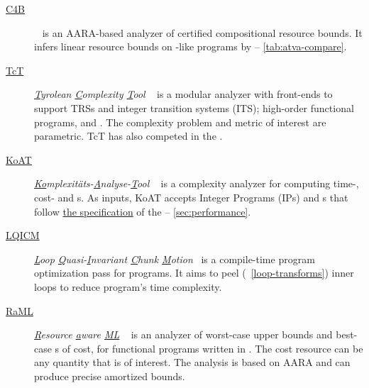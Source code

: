 \begin{description}
\item[\href{https://github.com/academic-archive/pldi15}{C4B}]
      ~\cite{carbonneaux2015}
      is an AARA-based analyzer of certified compositional resource bounds. It
      infers linear resource bounds on -like programs by  --
      \autoref{tab:atva-compare}.

\item[\href{http://cl-informatik.uibk.ac.at/software/tct/}{TcT}]
       \emph{\underline{T}yrolean \underline{C}omplexity \underline{T}ool}
       ~\cite{avanzini2016}
       is a modular analyzer with front-ends to support TRSs and integer
       transition systems (ITS); high-order functional programs, and . The complexity problem and metric of interest are parametric.
       TcT has also competed in the .

\item[\href{https://koat.verify.rwth-aachen.de/cfr_mprf}{KoAT}]
       \emph{\underline{Ko}mplexitäts-\underline{A}nalyse-\underline{T}ool}
       ~\cite{brockschmidt2016}
       is a complexity analyzer for computing time-, cost- and s. As inputs, KoAT accepts Integer Programs (IPs) and 
       s that follow
       \href{https://termination-portal.org/wiki/C_Integer_Programs}{the
        specification} of the  --
       \autoref{sec:performance}.

\item[\href{https://github.com/statycc/LQICM_On_C_Toy_Parser}{LQICM}]
      \emph{\underline{L}oop \underline{Q}uasi-\underline{I}nvariant
      \underline{C}hunk \underline{M}otion}~\cite{moyen20172} is a
      compile-time program optimization pass for  programs. It aims to
      peel (\cf~\autoref{loop-transforms}) inner loops to reduce program's time
      complexity.

\item[\href{https://www.raml.co/about}{RaML}]
       \emph{\underline{R}esource \underline{a}ware \underline{ML}}
       ~\cite{hoffmann2017}
       is an analyzer of worst-case upper bounds and best-case s of cost, for functional programs written in . The cost
       resource can be any quantity that is of interest. The  analysis
       is based on AARA and can produce precise amortized
       bounds.


\end{description}
